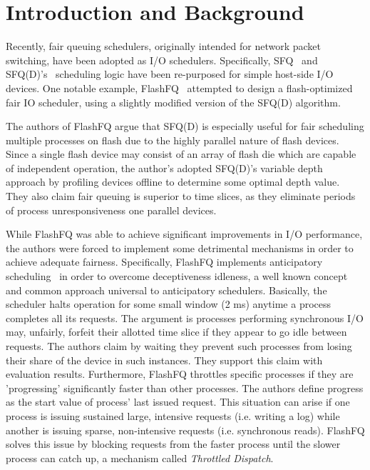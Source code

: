 \section{Introduction and Background}

Recently, fair queuing schedulers, originally intended for network
packet switching, have been adopted as I/O schedulers.  Specifically,
SFQ~\cite{SFQ} and SFQ(D)'s~\cite{SFQD} scheduling logic have been
re-purposed for simple host-side I/O devices.  One notable example,
FlashFQ~\cite{FlashFQ} attempted to design a flash-optimized fair IO
scheduler, using a slightly modified version of the SFQ(D) algorithm.

The authors of FlashFQ argue that SFQ(D) is especially useful for fair
scheduling multiple processes on flash due to the highly parallel
nature of flash devices.  Since a single flash device may consist of
an array of flash die which are capable of independent operation, the
author's adopted SFQ(D)'s variable depth approach by profiling devices
offline to determine some optimal depth value.  They also claim fair
queuing is superior to time slices, as they eliminate periods of
process unresponsiveness one parallel devices.

While FlashFQ was able to achieve significant improvements in I/O
performance, the authors were forced to implement some detrimental
mechanisms in order to achieve adequate fairness. Specifically,
FlashFQ implements anticipatory scheduling~\cite{anticipatory} in order
to overcome deceptiveness idleness, a well known concept and common
approach universal to anticipatory schedulers. Basically, the
scheduler halts operation for some small window (2 ms) anytime a
process completes all its requests. The argument is processes
performing synchronous I/O may, unfairly, forfeit their allotted
time slice if they appear to go idle between requests. The authors
claim by waiting they prevent such processes from losing their share
of the device in such instances. They support this claim with
evaluation results. Furthermore, FlashFQ throttles specific processes
if they are 'progressing' significantly faster than other
processes. The authors define progress as the start value of process'
last issued request. This situation can arise if one process is
issuing sustained large, intensive requests (i.e. writing a log) while
another is issuing sparse, non-intensive requests (i.e. synchronous
reads). FlashFQ solves this issue by blocking requests from the faster
process until the slower process can catch up, a mechanism called
\emph{Throttled Dispatch}.

